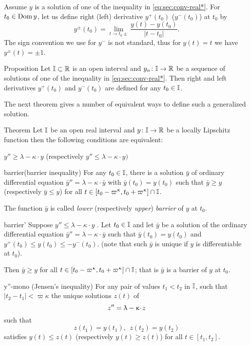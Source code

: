 Assume $y$ is a solution of one of the inequality in \ref{eq:sec:conv-real*}.
For $t_0\in \Dom y$, let us define right (left) derivative $y^+(t_0)$ ($y^-(t_0)$) at $t_0$ by
\[y^\pm(t_0)=\lim_{t\to t_0\pm} \frac{y(t)-y(t_0)}{|t-t_0|}.\]
The sign convention we use for $y^-$ is not standard, thus for $y(t)=t$ we have
$y^\pm(t)=\pm 1$.

\begin{thm}{Proposition}\label{prop:derivative-of-convex-function}
Let $\II\subset\RR$ is an open interval and $y_n\:\II\to\RR$ be a sequence of solutions of one of the inequality in \ref{eq:sec:conv-real*}.
Then right  and left derivatives $y^+(t_0)$ and $y^-(t_0)$ are defined
for any $t_0\in\II$.
\end{thm}


The next theorem gives a  number of equivalent ways to define such a generalized solution.

\begin{thm}{Theorem}\label{y''=<1-ky}
Let $\mathbb{I}$ be an open real interval and $y\:\II\to\RR$ be a locally Lipschitz function
then the following conditions are equivalent:
\begin{subthm}{}$y''\ge \lambda-\kappa\cdot  y$ (respectively $y''\le \lambda-\kappa\cdot  y)$
\end{subthm}

\begin{subthm}{barrier}(barrier inequality) For any $t_0\in \II$, 
there is a solution $\bar y$ 
of ordinary differential equation $\bar y''=\lambda-\kappa\cdot  \bar y$ 
with $\bar y(t_0)= y(t_0)$ such that $\bar y\ge y$ (respectively $\bar y\le y$) for all $t\in [t_0-\varpi\kappa,t_0+\varpi\kappa]\cap \II$.

The function $\bar y$ is called \emph{lower} (respectively \emph{upper}) \emph{barrier} of $y$ at $t_0$.
\end{subthm}

\begin{subthm}{barrier'} 
Suppose $y''\le \lambda-\kappa\cdot  y$ . Let $t_0\in\II$ and let  $\bar y$ be a solution of  the
 ordinary differential equation $\bar y''=\lambda-\kappa\cdot  \bar y$ 
such that  $\bar y(t_0)= y(t_0)$ and $y^+(t_0)\le y(t_0)\le -y^-(t_0)$. (note that such $\bar{y}$ is unique if $y$ is differentiable at $t_0$). 

Then $\bar y\ge y$  for all $t\in [t_0-\varpi\kappa,t_0+\varpi\kappa]\cap \II$; that is $\bar{y}$ is a barrier of $y$ at $t_0$.
\end{subthm}

\begin{subthm}{y''-mono} (Jensen's inequality)
For any pair of values $t_1<t_2$ in $\mathbb{I}$, such that $|t_2-t_1|<\varpi\kappa$ the unique solutions $z(t)$ of \[z''\z=\lambda-\kappa\cdot  z\] such that
\[z(t_1)=y(t_1),\ \ z(t_2)=y(t_2)\] 
satisfies $y(t)\le z(t)$ (respectively $y(t)\ge z(t)$) for all $t\in[t_1,t_2]$.
\end{subthm}
\end{thm}

